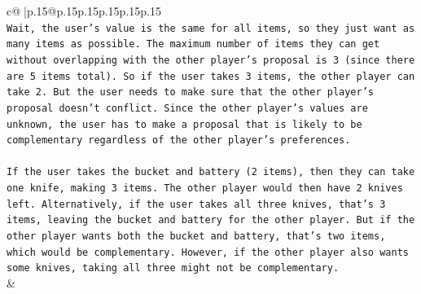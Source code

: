 \documentclass{article}
\begin{document}
{\begin{supertabular}{c@{$\;$}|p{.15\linewidth}@{}p{.15\linewidth}p{.15\linewidth}p{.15\linewidth}p{.15\linewidth}p{.15\linewidth}}
{{{\\ 
\texttt{Wait, the user's value is the same for all items, so they just want as many items as possible. The maximum number of items they can get without overlapping with the other player's proposal is 3 (since there are 5 items total). So if the user takes 3 items, the other player can take 2. But the user needs to make sure that the other player's proposal doesn't conflict. Since the other player's values are unknown, the user has to make a proposal that is likely to be complementary regardless of the other player's preferences.} \\
\\ 
\texttt{If the user takes the bucket and battery (2 items), then they can take one knife, making 3 items. The other player would then have 2 knives left. Alternatively, if the user takes all three knives, that's 3 items, leaving the bucket and battery for the other player. But if the other player wants both the bucket and battery, that's two items, which would be complementary. However, if the other player also wants some knives, taking all three might not be complementary.} \\
            }
        }
    }
    & \\ \\


\end{supertabular}}
\end{document}
